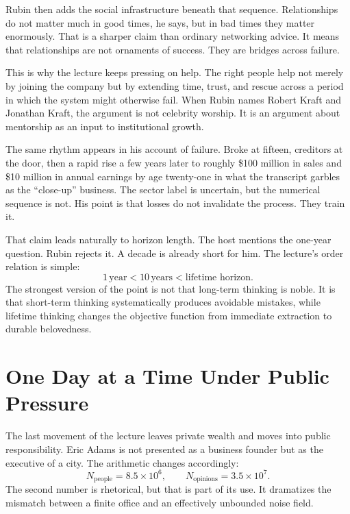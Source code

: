 Rubin then adds the social infrastructure beneath that sequence. Relationships do not matter much in good times, he says, but in bad times they matter enormously. That is a sharper claim than ordinary networking advice. It means that relationships are not ornaments of success. They are bridges across failure.

This is why the lecture keeps pressing on help. The right people help not merely by joining the company but by extending time, trust, and rescue across a period in which the system might otherwise fail. When Rubin names Robert Kraft and Jonathan Kraft, the argument is not celebrity worship. It is an argument about mentorship as an input to institutional growth.

The same rhythm appears in his account of failure. Broke at fifteen, creditors at the door, then a rapid rise a few years later to roughly \$100 million in sales and \$10 million in annual earnings by age twenty-one in what the transcript garbles as the ``close-up'' business. The sector label is uncertain, but the numerical sequence is not. His point is that losses do not invalidate the process. They train it.

That claim leads naturally to horizon length. The host mentions the one-year question. Rubin rejects it. A decade is already short for him. The lecture's order relation is simple:
\begin{equation}
1\,\mathrm{year}<10\,\mathrm{years}<\text{lifetime horizon}.
\end{equation}
The strongest version of the point is not that long-term thinking is noble. It is that short-term thinking systematically produces avoidable mistakes, while lifetime thinking changes the objective function from immediate extraction to durable belovedness.

\section{One Day at a Time Under Public Pressure}

The last movement of the lecture leaves private wealth and moves into public responsibility. Eric Adams is not presented as a business founder but as the executive of a city. The arithmetic changes accordingly:
\begin{equation}
N_{\mathrm{people}}=8.5\times 10^6,\qquad
N_{\mathrm{opinions}}=3.5\times 10^7.
\end{equation}
The second number is rhetorical, but that is part of its use. It dramatizes the mismatch between a finite office and an effectively unbounded noise field.

